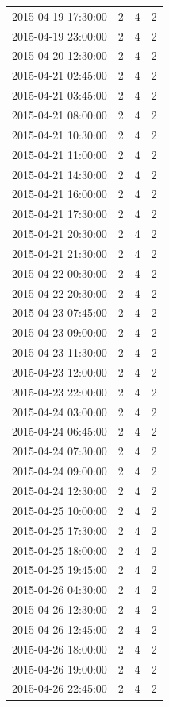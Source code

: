 \begin{tabular}{lrrr}
2015-04-19 17:30:00 & 2 & 4 & 2 \\
2015-04-19 23:00:00 & 2 & 4 & 2 \\
2015-04-20 12:30:00 & 2 & 4 & 2 \\
2015-04-21 02:45:00 & 2 & 4 & 2 \\
2015-04-21 03:45:00 & 2 & 4 & 2 \\
2015-04-21 08:00:00 & 2 & 4 & 2 \\
2015-04-21 10:30:00 & 2 & 4 & 2 \\
2015-04-21 11:00:00 & 2 & 4 & 2 \\
2015-04-21 14:30:00 & 2 & 4 & 2 \\
2015-04-21 16:00:00 & 2 & 4 & 2 \\
2015-04-21 17:30:00 & 2 & 4 & 2 \\
2015-04-21 20:30:00 & 2 & 4 & 2 \\
2015-04-21 21:30:00 & 2 & 4 & 2 \\
2015-04-22 00:30:00 & 2 & 4 & 2 \\
2015-04-22 20:30:00 & 2 & 4 & 2 \\
2015-04-23 07:45:00 & 2 & 4 & 2 \\
2015-04-23 09:00:00 & 2 & 4 & 2 \\
2015-04-23 11:30:00 & 2 & 4 & 2 \\
2015-04-23 12:00:00 & 2 & 4 & 2 \\
2015-04-23 22:00:00 & 2 & 4 & 2 \\
2015-04-24 03:00:00 & 2 & 4 & 2 \\
2015-04-24 06:45:00 & 2 & 4 & 2 \\
2015-04-24 07:30:00 & 2 & 4 & 2 \\
2015-04-24 09:00:00 & 2 & 4 & 2 \\
2015-04-24 12:30:00 & 2 & 4 & 2 \\
2015-04-25 10:00:00 & 2 & 4 & 2 \\
2015-04-25 17:30:00 & 2 & 4 & 2 \\
2015-04-25 18:00:00 & 2 & 4 & 2 \\
2015-04-25 19:45:00 & 2 & 4 & 2 \\
2015-04-26 04:30:00 & 2 & 4 & 2 \\
2015-04-26 12:30:00 & 2 & 4 & 2 \\
2015-04-26 12:45:00 & 2 & 4 & 2 \\
2015-04-26 18:00:00 & 2 & 4 & 2 \\
2015-04-26 19:00:00 & 2 & 4 & 2 \\
2015-04-26 22:45:00 & 2 & 4 & 2 \\

\end{tabular}

